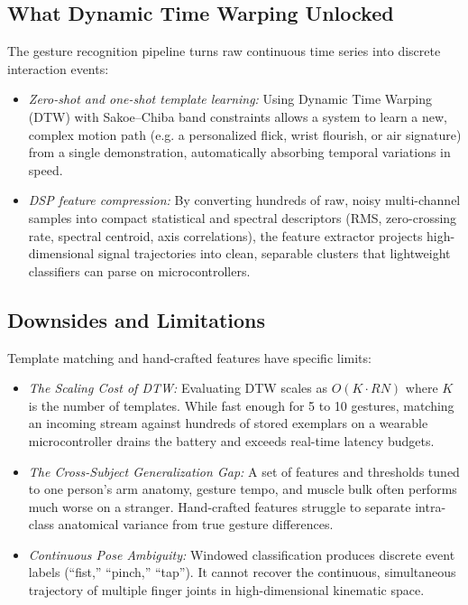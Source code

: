 \subsection{What Dynamic Time Warping Unlocked}
The gesture recognition pipeline turns raw continuous time series into discrete interaction events:
\begin{itemize}
  \item \emph{Zero-shot and one-shot template learning:} Using Dynamic Time Warping (DTW) with Sakoe--Chiba band constraints allows a system to learn a new, complex motion path (e.g. a personalized flick, wrist flourish, or air signature) from a single demonstration, automatically absorbing temporal variations in speed.
  \item \emph{DSP feature compression:} By converting hundreds of raw, noisy multi-channel samples into compact statistical and spectral descriptors (RMS, zero-crossing rate, spectral centroid, axis correlations), the feature extractor projects high-dimensional signal trajectories into clean, separable clusters that lightweight classifiers can parse on microcontrollers.
\end{itemize}

\subsection{Downsides and Limitations}
Template matching and hand-crafted features have specific limits:
\begin{itemize}
  \item \emph{The Scaling Cost of DTW:} Evaluating DTW scales as $O(K \cdot RN)$ where $K$ is the number of templates. While fast enough for 5 to 10 gestures, matching an incoming stream against hundreds of stored exemplars on a wearable microcontroller drains the battery and exceeds real-time latency budgets.
  \item \emph{The Cross-Subject Generalization Gap:} A set of features and thresholds tuned to one person's arm anatomy, gesture tempo, and muscle bulk often performs much worse on a stranger. Hand-crafted features struggle to separate intra-class anatomical variance from true gesture differences.
  \item \emph{Continuous Pose Ambiguity:} Windowed classification produces discrete event labels (``fist,'' ``pinch,'' ``tap''). It cannot recover the continuous, simultaneous trajectory of multiple finger joints in high-dimensional kinematic space.
\end{itemize}

